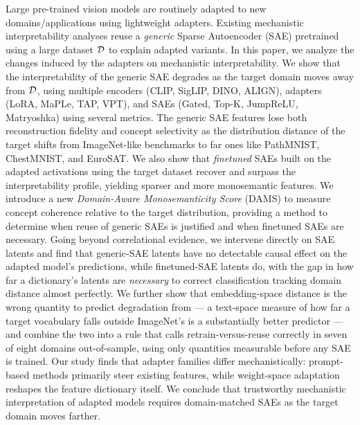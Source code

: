 

Large pre-trained vision models are routinely adapted to new domains/applications using lightweight adapters. Existing mechanistic interpretability analyses reuse a \emph{generic} Sparse Autoencoder (SAE) pretrained using a large dataset $\cal D$ to explain adapted variants. In this paper, we analyze the changes induced by the adapters on mechanistic interpretability. We show that the interpretability of the generic SAE degrades as the target domain moves away from $\cal D$, using multiple encoders (CLIP, SigLIP, DINO, ALIGN), adapters (LoRA, MaPLe, TAP, VPT), and SAEs (Gated, Top-K, JumpReLU, Matryoshka) using several metrics. The generic SAE features lose both reconstruction fidelity and concept selectivity as the distribution distance of the target shifts from ImageNet-like benchmarks to far ones like PathMNIST, ChestMNIST, and EuroSAT. We also show that {\em finetuned} SAEs built on the adapted activations using the target dataset recover and surpass the interpretability profile, yielding sparser and more monosemantic features. We introduce a new \emph{Domain-Aware Monosemanticity Score} (DAMS) to measure concept coherence relative to the target distribution, providing a method to determine when reuse of generic SAEs is justified and when finetuned SAEs are necessary. Going beyond correlational evidence, we intervene directly on SAE latents and find that generic-SAE latents have no detectable causal effect on the adapted model's predictions, while finetuned-SAE latents do, with the gap in how far a dictionary's latents are \emph{necessary} to correct classification tracking domain distance almost perfectly. We further show that embedding-space distance is the wrong quantity to predict degradation from --- a text-space measure of how far a target vocabulary falls outside ImageNet's is a substantially better predictor --- and combine the two into a rule that calls retrain-versus-reuse correctly in seven of eight domains out-of-sample, using only quantities measurable before any SAE is trained. Our study finds that adapter families differ mechanistically: prompt-based methods primarily steer existing features, while weight-space adaptation reshapes the feature dictionary itself. We conclude that trustworthy mechanistic interpretation of adapted models requires domain-matched SAEs as the target domain moves farther.

